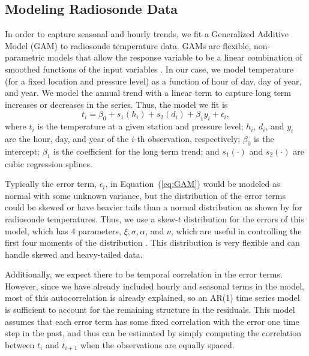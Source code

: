 \documentclass[12pt]{article}
\def\ni{\noindent}
\begin{document}
\begin{doublespacing}
\subsection{Modeling Radiosonde Data}
\label{ssec:model}

In order to capture seasonal and hourly trends, we fit a Generalized Additive Model (GAM) to  radiosonde temperature data.  GAMs are flexible, non-parametric models that allow the response variable to be a linear combination of smoothed functions of the input variables \cite{hastie90}.  In our case, we model temperature (for a fixed location and pressure level) as a function of hour of day, day of year, and year.  We model the annual trend with a linear term to capture long term increases or decreases in the series.  Thus, the model we fit is
\begin{equation} \label{eq:GAM}
	t_i = \beta_0 + s_1(h_i) + s_2(d_i) + \beta_1 y_i + \epsilon_i,
\end{equation}
\ni where $t_i$ is the temperature at a given station and pressure level; $h_i$, $d_i$, and $y_i$ are the hour, day, and year of the $i$-th observation, respectively; $\beta_0$ is the intercept; $\beta_1$ is the coefficient for the long term trend; and $s_1(\cdot)$ and $s_2(\cdot)$ are cubic regression splines.

Typically the error term, $\epsilon_i$, in Equation~(\ref{eq:GAM}) would be modeled as normal with some unknown variance, but the distribution of the error terms could be skewed or have heavier tails than a normal distribution as shown by \cite{bell14} for radiosonde temperatures.  Thus, we use a skew-$t$ distribution for the errors of this model, which has 4 parameters, $\xi, \sigma, \alpha$, and $\nu$, which are useful in controlling the first four moments of the distribution \cite{azzalini03}.  This distribution is very flexible and can handle skewed and heavy-tailed data.

Additionally, we expect there to be temporal correlation in the error terms.  However, since we have already included hourly and seasonal terms in the model,  most of this autocorrelation is already explained, so an AR(1) time series model is sufficient to account for the remaining structure in the residuals.  This model assumes that each error term has some fixed correlation with the error one time step in the past, and thus can be estimated by simply computing the correlation between $t_i$ and $t_{i+1}$ when the observations are equally spaced.


\end{doublespacing}
\end{document}
